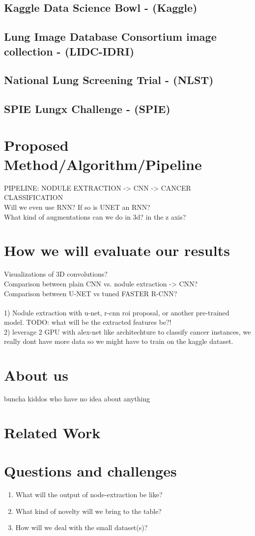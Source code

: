 \documentclass[twocolumn,10pt]{article}
\newcommand{\temp}[1]{{\color{red}#1\\}}
\begin{document}
\subsection{Kaggle Data Science Bowl - (Kaggle)}
\subsection{Lung Image Database Consortium image collection - (LIDC-IDRI)}
\subsection{National Lung Screening Trial - (NLST)}
\subsection{SPIE Lungx Challenge - (SPIE)}


\section{Proposed Method/Algorithm/Pipeline}

\temp{PIPELINE: NODULE EXTRACTION -> CNN -> CANCER CLASSIFICATION}
\temp{Will we even use RNN? If so is UNET an RNN?}
\temp{What kind of augmentations can we do in 3d? in the z axis?}
\section{How we will evaluate our results}
\temp{Visualizations of 3D convolutions?}
\temp{Comparison between plain CNN vs. nodule extraction -> CNN? }
\temp{Comparison between U-NET vs tuned FASTER R-CNN?}
\temp{}
\temp{
	1) Nodule extraction with u-net, r-cnn roi proposal, or another pre-trained
	model. TODO: what will be the extracted features be?! \\
	2) leverage 2 GPU with alex-net like architechture to classify cancer
	instances, we really dont have more data so we might have to train on the
	kaggle dataset.
}

\section{About us}
\temp{buncha kiddos who have no idea about anything}

\section{Related Work}

\section{Questions and challenges}
\begin{enumerate}
	\item What will the output of node-extraction be like?
	\item What kind of novelty will we bring to the table?
	\item How will we deal with the small dataset(s)?
\end{enumerate}
\end{document}

